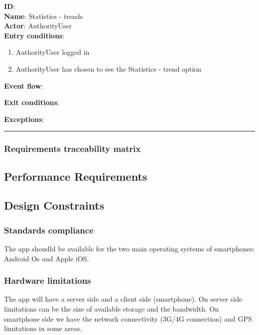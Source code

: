    \textbf{ID}:  \\
    \textbf{Name}: Statistics - trends \\
    \textbf{Actor}: AuthorityUser   \\
    \textbf{Entry conditions}:
    \begin{enumerate}
      \item{AuthorityUser logged in}
      \item{AuthorityUser has chosen to see the Statistics - trend option}
    \end{enumerate}
    \textbf{Event flow}:
    \begin{enumerate}
      \item {
      \item
    \end{enumerate}
    \textbf{Exit conditions}:
    \begin{enumerate}

    \end{enumerate}
    \textbf{Exceptions}:
    \begin{enumerate}
    \end{enumerate}
    \rule{\linewidth}{0.4pt}



\subsubsection{Requirements traceability matrix}




\subsection{Performance Requirements}

\subsection{Design Constraints}%

\subsubsection{Standards compliance}
The app shoudld be available for the two main operating systems of smartphones: Android Os and Apple iOS.\\



\subsubsection{Hardware limitations}
The app will have a server side and a client side (smartphone).
On server side limitations can be the size of available storage and the bandwidth.
On smartphone side we have the network connectivity (3G/4G connection) and GPS limitations in some areas.

